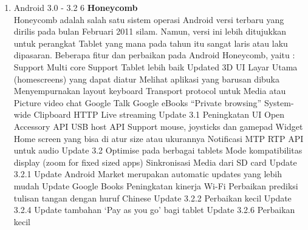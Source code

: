 \begin{enumerate}
\item Android 3.0 - 3.2 6 \textbf{Honeycomb}\\
Honeycomb adalah salah satu sistem operasi Android versi terbaru yang dirilis pada bulan Februari 2011 silam. Namun, versi ini lebih ditujukkan untuk perangkat Tablet yang mana pada tahun itu sangat laris atau laku dipasaran. Beberapa fitur dan perbaikan pada Android Honeycomb, yaitu :
Support Multi core
Support Tablet lebih baik
Updated 3D UI
Layar Utama (homescreens) yang dapat diatur
Melihat aplikasi yang barusan dibuka
Menyempurnakan layout keyboard
Transport protocol untuk Media atau Picture
video chat Google Talk
Google eBooks
“Private browsing”
System-wide Clipboard
HTTP Live streaming
Update 3.1
Peningkatan UI
Open Accessory API
USB host API
Support mouse, joysticks dan gamepad
Widget Home screen yang bisa di atur size atau ukurannya
Notificasi MTP
RTP API untuk audio
Update 3.2
Optimise pada berbagai tablets
Mode kompatibilitas display (zoom for fixed sized apps)
Sinkronisasi Media dari SD card
Update 3.2.1
Update Android Market merupakan automatic updates yang lebih mudah
Update Google Books
Peningkatan kinerja Wi-Fi
Perbaikan prediksi tulisan tangan dengan huruf Chinese
Update 3.2.2
Perbaikan kecil
Update 3.2.4
Update tambahan ‘Pay as you go’ bagi tablet
Update 3.2.6
Perbaikan kecil


\end{enumerate}
